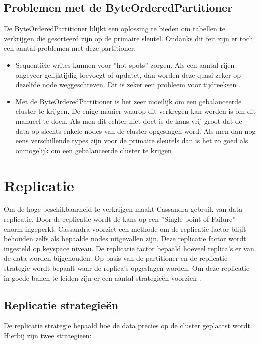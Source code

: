 \subsection{Problemen met de ByteOrderedPartitioner}
De ByteOrderedPartitioner blijkt een oplossing te bieden om tabellen te verkrijgen die gesorteerd zijn op de primaire sleutel.
Ondanks dit feit zijn er toch een aantal problemen met deze partitioner.

\begin{itemize}
	\item Sequentiële writes kunnen voor ''hot spots'' zorgen.
	Als een aantal rijen ongeveer gelijktijdig toevoegt of updatet, dan worden deze quasi zeker op dezelfde node weggeschreven.
	Dit is zeker een probleem voor tijdreeksen \citep{kan2014cassandra}.
	
	\item Met de ByteOrderedPartitioner is het zeer moeilijk om een gebalanceerde cluster te krijgen.
	De enige manier waarop dit verkregen kan worden is om dit manueel te doen.
	Als men dit echter niet doet is de kans vrij groot dat de data op slechts enkele nodes van de cluster opgeslagen word.
	Als men dan nog eens verschillende types zijn voor de primaire sleutels dan is het zo goed als onmogelijk om een gebalanceerde cluster te krijgen
	\citep{Bauer2013CaseAgainstByteOrder}.
\end{itemize}

\section{Replicatie}
Om de hoge beschikbaarheid te verkrijgen maakt Cassandra gebruik van data replicatie.
Door de replicatie wordt de kans op een ''Single point of Failure'' enorm ingeperkt.
Cassandra voorziet een methode om de replicatie factor blijft behouden zelfs als bepaalde nodes uitgevallen zijn.
Deze replicatie factor wordt ingesteld op keyspace niveau.
De replicatie factor bepaald hoeveel replica's er van de data worden bijgehouden.
Op basis van de partitioner en de replicatie strategie wordt  bepaalt waar de replica's opgeslagen worden.
Om deze replicatie in goede banen te leiden zijn er een aantal strategieën voorzien \citep{kan2014cassandra}.

\subsection{Replicatie strategieën}
De replicatie strategie bepaald hoe de data precies op de cluster geplaatst wordt.
Hierbij zijn twee strategieën:

